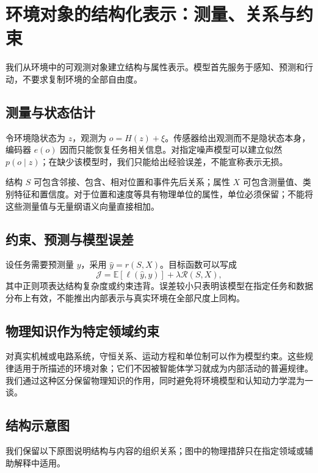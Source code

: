 \chapter{环境对象的结构化表示：测量、关系与约束}
\label{chp:physics_anatomy}
\label{sec:general_relativity}
\label{sec:quantum_field}
\label{sec:condensed_matter}
\label{sec:mirror_table}
我们从环境中的可观测对象建立结构与属性表示。模型首先服务于感知、预测和行动，不要求复制环境的全部自由度。
\section{测量与状态估计}
令环境隐状态为 $z$，观测为 $o=H(z)+\xi$。传感器给出观测而不是隐状态本身，编码器 $e(o)$ 因而只能恢复任务相关信息。对指定噪声模型可以建立似然 $p(o\mid z)$；在缺少该模型时，我们只能给出经验误差，不能宣称表示无损。

结构 $S$ 可包含邻接、包含、相对位置和事件先后关系；属性 $X$ 可包含测量值、类别特征和置信度。对于位置和速度等具有物理单位的属性，单位必须保留；不能将这些测量值与无量纲语义向量直接相加。
\section{约束、预测与模型误差}
设任务需要预测量 $y$，采用 $\widehat y=r(S,X)$。目标函数可以写成
\begin{equation}\mathcal J=\mathbb E[\ell(\widehat y,y)]+\lambda\mathcal R(S,X),\end{equation}
其中正则项表达结构复杂度或约束违背。误差较小只表明该模型在指定任务和数据分布上有效，不能推出内部表示与真实环境在全部尺度上同构。
\section{物理知识作为特定领域约束}
对真实机械或电路系统，守恒关系、运动方程和单位制可以作为模型约束。这些规律适用于所描述的环境对象；它们不因被智能体学习就成为内部活动的普遍规律。我们通过这种区分保留物理知识的作用，同时避免将环境模型和认知动力学混为一谈。

\section{结构示意图}
我们保留以下原图说明结构与内容的组织关系；图中的物理措辞只在指定领域或辅助解释中适用。

